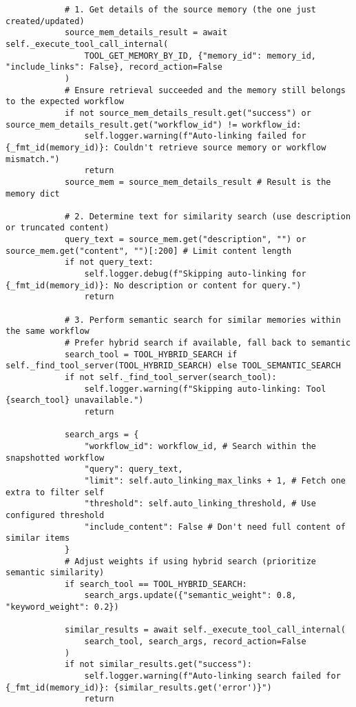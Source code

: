 \documentclass[12pt,a4paper]{article}
\begin{document}
\begin{pageablecode}
\begin{verbatim}
            # 1. Get details of the source memory (the one just created/updated)
            source_mem_details_result = await self._execute_tool_call_internal(
                TOOL_GET_MEMORY_BY_ID, {"memory_id": memory_id, "include_links": False}, record_action=False
            )
            # Ensure retrieval succeeded and the memory still belongs to the expected workflow
            if not source_mem_details_result.get("success") or source_mem_details_result.get("workflow_id") != workflow_id:
                self.logger.warning(f"Auto-linking failed for {_fmt_id(memory_id)}: Couldn't retrieve source memory or workflow mismatch.")
                return
            source_mem = source_mem_details_result # Result is the memory dict

            # 2. Determine text for similarity search (use description or truncated content)
            query_text = source_mem.get("description", "") or source_mem.get("content", "")[:200] # Limit content length
            if not query_text:
                self.logger.debug(f"Skipping auto-linking for {_fmt_id(memory_id)}: No description or content for query.")
                return

            # 3. Perform semantic search for similar memories within the same workflow
            # Prefer hybrid search if available, fall back to semantic
            search_tool = TOOL_HYBRID_SEARCH if self._find_tool_server(TOOL_HYBRID_SEARCH) else TOOL_SEMANTIC_SEARCH
            if not self._find_tool_server(search_tool):
                self.logger.warning(f"Skipping auto-linking: Tool {search_tool} unavailable.")
                return

            search_args = {
                "workflow_id": workflow_id, # Search within the snapshotted workflow
                "query": query_text,
                "limit": self.auto_linking_max_links + 1, # Fetch one extra to filter self
                "threshold": self.auto_linking_threshold, # Use configured threshold
                "include_content": False # Don't need full content of similar items
            }
            # Adjust weights if using hybrid search (prioritize semantic similarity)
            if search_tool == TOOL_HYBRID_SEARCH:
                search_args.update({"semantic_weight": 0.8, "keyword_weight": 0.2})

            similar_results = await self._execute_tool_call_internal(
                search_tool, search_args, record_action=False
            )
            if not similar_results.get("success"):
                self.logger.warning(f"Auto-linking search failed for {_fmt_id(memory_id)}: {similar_results.get('error')}")
                return


\end{verbatim}
\end{pageablecode}
\end{document}
